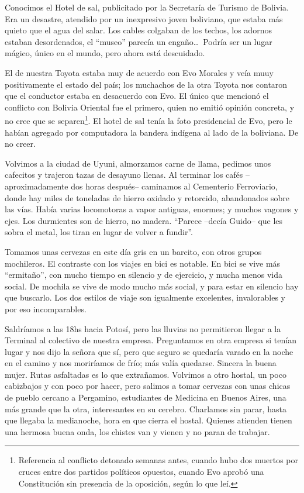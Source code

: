 Conocimos el Hotel de sal, publicitado por la Secretaría de Turismo de Bolivia.
Era un desastre, atendido por un inexpresivo joven boliviano, que estaba más
quieto que el agua del salar. Los cables colgaban de los techos, los adornos
estaban desordenados, el ``museo'' parecía un engaño\ldots\ Podría ser un
lugar mágico, único en el mundo, pero ahora está descuidado.

El de nuestra Toyota estaba muy de acuerdo con Evo Morales y veía muuy
positivamente el estado del país; los muchachos de la otra Toyota nos contaron
que el conductor estaba en desacuerdo con Evo. El único que mencionó el
conflicto con Bolivia Oriental fue el primero, quien no emitió opinión
concreta, y no cree que se separen\protect\footnote{Referencia al conflicto
detonado semanas antes, cuando hubo dos muertos por cruces entre dos partidos
políticos opuestos, cuando Evo aprobó una Constitución sin presencia de la
oposición, según lo que leí.}. El hotel de sal tenía la foto presidencial de
Evo, pero le habían agregado por computadora la bandera indígena al lado de la
boliviana. De no creer.

Volvimos a la ciudad de Uyuni, almorzamos carne de llama, pedimos unos cafecitos
y trajeron tazas de desayuno llenas. Al terminar los cafés --aproximadamente
dos horas después-- caminamos al Cementerio Ferroviario, donde hay miles de
toneladas de hierro oxidado y retorcido, abandonados sobre las vías. Había
varias locomotoras a vapor antiguas, enormes; y muchos vagones y ejes. Los
durmientes son de hierro, no madera. ``Parece --decía Guido-- que les sobra el
metal, los tiran en lugar de volver a fundir''.

Tomamos unas cervezas en este día gris en un barcito, con otros grupos
mochileros. El contraste con los viajes en bici es notable. En bici se vive más
``ermitaño'', con mucho tiempo en silencio y de ejercicio, y mucha menos vida
social. De mochila se vive de modo mucho más social, y para estar en silencio
hay que buscarlo. Los dos estilos de viaje son igualmente excelentes,
invalorables y por eso incomparables.

Saldríamos a las 18hs hacia Potosí, pero las lluvias no permitieron llegar a
la Terminal al colectivo de nuestra empresa. Preguntamos en otra empresa si
tenían lugar y nos dijo la señora que sí, pero que seguro se quedaría
varado en la noche en el camino y nos moriríamos de frío; más valía
quedarse. Sincera la buena mujer. Rutas asfaltadas es lo que extrañamos.
Volvimos a otro hostal, un poco cabizbajos y con poco por hacer, pero salimos a
tomar cervezas con unas chicas de pueblo cercano a Pergamino, estudiantes de
Medicina en Buenos Aires, una más grande que la otra, interesantes en su
cerebro. Charlamos sin parar, hasta que llegaba la medianoche, hora en que
cierra el hostal. Quienes atienden tienen una hermosa buena onda, los chistes
van y vienen y no paran de trabajar.\\

